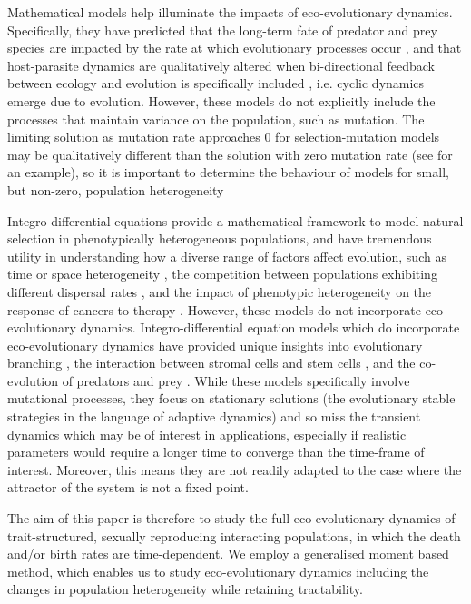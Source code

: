 \documentclass[]{article}
\theoremstyle{remark}
\begin{document}
Mathematical models help illuminate the impacts of eco-evolutionary dynamics. Specifically, they have predicted that the long-term fate of predator and prey species are impacted by the rate at which evolutionary processes occur \cite{marrow1996evolutionary,dieckmann1996dynamical}, and that host-parasite dynamics are qualitatively altered when bi-directional feedback between ecology and evolution is specifically included \cite{ashby2019understanding,best2023fluctuating}, i.e. cyclic dynamics emerge due to evolution. However, these models do not explicitly include the processes that maintain variance on the population, such as mutation. The limiting solution as mutation rate approaches $0$ for selection-mutation models may be qualitatively different than the solution with zero mutation rate (see \cite{lorenzi2020asymptotic} for an example), so it is important to determine the behaviour of models for small, but non-zero, population heterogeneity

Integro-differential equations provide a mathematical framework to model natural selection in phenotypically heterogeneous populations, and have tremendous utility in understanding how a diverse range of factors affect evolution, such as time or space heterogeneity  \cite{iglesias2021selection,roques2020adaptation,figueroa2018long, bouin2015hamilton},  the competition between populations exhibiting different dispersal rates \cite{lam2023hamilton, bouin2014travelling}, and the impact of phenotypic heterogeneity on the response of cancers to therapy \cite{ardavseva2020comparative,lorenzi2015dissecting,lorenzi2016tracking}. However, these models do not incorporate eco-evolutionary dynamics. Integro-differential equation models which do incorporate eco-evolutionary dynamics have provided unique insights into evolutionary branching \cite{diekmann2005dynamics}, the interaction between stromal cells and stem cells \cite{nguyen2019adaptive}, and the co-evolution of predators and prey \cite{calsina1994non}. While these models  specifically involve mutational processes, they focus on stationary solutions (the evolutionary stable strategies in the language of adaptive dynamics) and so miss the transient dynamics which may be of interest in applications, especially if realistic parameters would require a longer time to converge than the time-frame of interest. Moreover, this means they are not readily adapted to the case where the attractor of the system is not a fixed point. 

The aim of this paper is therefore to study the full eco-evolutionary dynamics of trait-structured, sexually reproducing interacting populations, in which the death and/or birth rates are time-dependent. We employ a generalised moment based method, which enables us to study eco-evolutionary dynamics including the changes in population heterogeneity while retaining tractability. 
\end{document}

